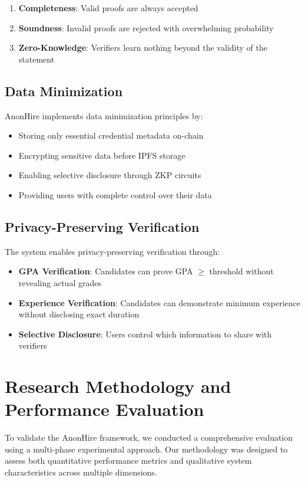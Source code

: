 \documentclass[conference]{IEEEtran}
\begin{document}
\begin{enumerate}
\item \textbf{Completeness}: Valid proofs are always accepted
\item \textbf{Soundness}: Invalid proofs are rejected with overwhelming probability
\item \textbf{Zero-Knowledge}: Verifiers learn nothing beyond the validity of the statement
\end{enumerate}

\subsection{Data Minimization}

AnonHire implements data minimization principles by:

\begin{itemize}
\item Storing only essential credential metadata on-chain
\item Encrypting sensitive data before IPFS storage
\item Enabling selective disclosure through ZKP circuits
\item Providing users with complete control over their data
\end{itemize}

\subsection{Privacy-Preserving Verification}

The system enables privacy-preserving verification through:

\begin{itemize}
\item \textbf{GPA Verification}: Candidates can prove GPA $\geq$ threshold without revealing actual grades
\item \textbf{Experience Verification}: Candidates can demonstrate minimum experience without disclosing exact duration
\item \textbf{Selective Disclosure}: Users control which information to share with verifiers
\end{itemize}

\section{Research Methodology and Performance Evaluation}

To validate the AnonHire framework, we conducted a comprehensive evaluation using a multi-phase experimental approach. Our methodology was designed to assess both quantitative performance metrics and qualitative system characteristics across multiple dimensions.
\end{document}
